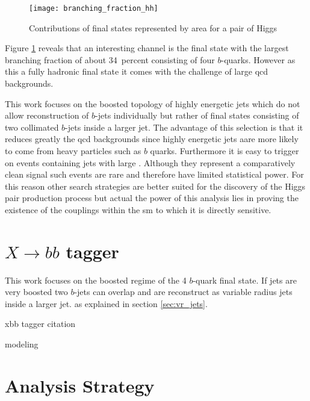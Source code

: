 \begin{figure}
    \centering
    \texttt{[image: branching\_fraction\_hh]}
    \caption[]{Contributions of final states represented by area for a pair of Higgs \citep{Abbott:2708599}}
    \label{fig:branching_fraction_hh}
\end{figure}
Figure \ref{fig:branching_fraction_hh} reveals that an interesting channel is the final state with the largest branching fraction of about \qty[]{34}{percent} consisting of four $b$-quarks. However as this a fully hadronic final state it comes with the challenge of large \ac{qcd} backgrounds.

This work focuses on the boosted topology of highly energetic jets which do not allow reconstruction of $b$-jets individually but rather of final states consisting of two collimated $b$-jets inside a larger jet. The advantage of this selection is that it reduces greatly the \ac{qcd} backgrounds since highly energetic jets aare more likely to come from heavy particles such as $b$ quarks. Furthermore it is easy to trigger on events containing jets with large \pt. Although they represent a comparatively clean signal such events are rare and therefore have limited statistical power. For this reason other search strategies are better suited for the discovery of the Higgs pair production process but actual the power of this analysis lies in proving the existence of the \ktwov couplings within the \ac{sm} to which it is directly sensitive.




\section{$X\rightarrow bb$ tagger}

This work focuses on the boosted regime of the 4 $b$-quark final state. If jets are very boosted two $b$-jets can overlap and are reconstruct as variable radius jets inside a larger jet.
as explained in section \ref{sec:vr_jets}.

xbb tagger citation
\citep{ATL-PHYS-PUB-2020-019}

modeling

\section{Analysis Strategy}